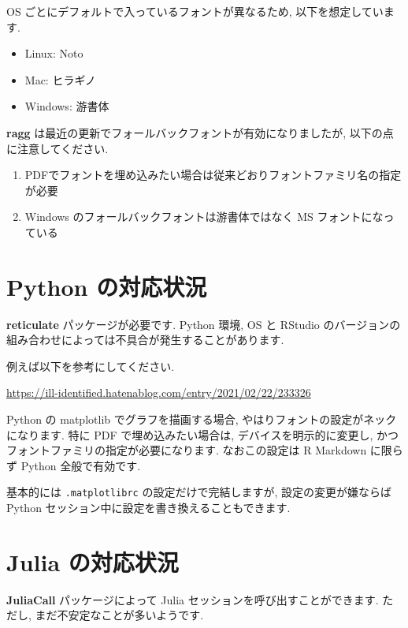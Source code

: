 \documentclass[
]{bxjsarticle}
\providecommand{\tightlist}{%
  \setlength{\itemsep}{0pt}\setlength{\parskip}{0pt}}
\begin{document}
OS ごとにデフォルトで入っているフォントが異なるため, 以下を想定しています.

\begin{itemize}
\tightlist
\item
  Linux: Noto
\item
  Mac: ヒラギノ
\item
  Windows: 游書体
\end{itemize}

\textbf{ragg} は最近の更新でフォールバックフォントが有効になりましたが, 以下の点に注意してください.

\begin{enumerate}
\def\labelenumi{\arabic{enumi}.}
\tightlist
\item
  PDFでフォントを埋め込みたい場合は従来どおりフォントファミリ名の指定が必要
\item
  Windows のフォールバックフォントは游書体ではなく MS フォントになっている
\end{enumerate}

\hypertarget{python-ux306eux5bfeux5fdcux72b6ux6cc1}{%
\section{Python の対応状況}\label{python-ux306eux5bfeux5fdcux72b6ux6cc1}}

\textbf{reticulate} パッケージが必要です. Python 環境, OS と RStudio のバージョンの組み合わせによっては不具合が発生することがあります.

例えば以下を参考にしてください.

\url{https://ill-identified.hatenablog.com/entry/2021/02/22/233326}

Python の matplotlib でグラフを描画する場合, やはりフォントの設定がネックになります. 特に PDF で埋め込みたい場合は, デバイスを明示的に変更し, かつフォントファミリの指定が必要になります. なおこの設定は R Markdown に限らず Python 全般で有効です.

基本的には \texttt{.matplotlibrc} の設定だけで完結しますが, 設定の変更が嫌ならば Python セッション中に設定を書き換えることもできます.

\hypertarget{julia-ux306eux5bfeux5fdcux72b6ux6cc1}{%
\section{Julia の対応状況}\label{julia-ux306eux5bfeux5fdcux72b6ux6cc1}}

\textbf{JuliaCall} パッケージによって Julia セッションを呼び出すことができます. ただし, まだ不安定なことが多いようです.
\end{document}
